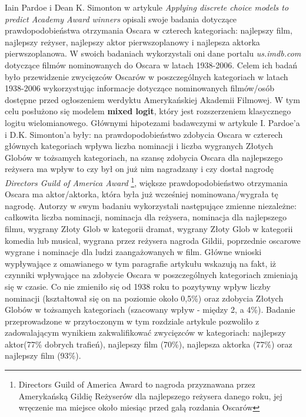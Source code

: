 Iain Pardoe i Dean K. Simonton w artykule \textit{Applying discrete choice models to predict Academy Award winners} \cite{pardoe08} opisali swoje badania dotyczące prawdopodobieństwa otrzymania Oscara w czterech kategoriach: najlepszy film, najlepszy reżyser, najlepszy aktor pierwszoplanowy i najlepsza aktorka pierwszoplanowa. W swoich badaniach wykorzystali oni dane portalu \textit{us.imdb.com} dotyczące filmów nominowanych do Oscara w latach 1938-2006. Celem ich badań było przewidzenie zwycięzców Oscarów w poszczególnych kategoriach w latach 1938-2006 wykorzystując informacje dotyczące nominowanych filmów/osób dostępne przed ogłoszeniem werdyktu Amerykańskiej Akademii Filmowej. W tym celu posłużono się modelem \textbf{ mixed logit}, który jest rozszerzeniem klasycznego logitu wielomianowego. Głównymi hipotezami badawczymi w artykule I. Pardoe'a i D.K. Simonton'a były: na prawdopodobieństwo zdobycia Oscara w czterech głównych kategoriach wpływa liczba nominacji i liczba wygranych Złotych Globów w tożsamych kategoriach, na szansę zdobycia Oscara dla najlepszego reżysera ma wpływ to czy był on już nim nagradzany i czy dostał nagrodę \textit{Directors Guild of America Award} \footnote{ Directors Guild of America Award to nagroda przyznawana przez Amerykańską Gildię Reżyserów dla najlepszego reżysera danego roku, jej wręczenie ma miejsce około miesiąc przed galą rozdania Oscarów}, większe prawdopodobieństwo otrzymania Oscara ma aktor/aktorka, która była już wcześniej nominowana/wygrała tę nagrodę. Autorzy w swym badaniu wykorzystali następujące zmienne niezależne: całkowita liczba nominacji, nominacja dla reżysera, nominacja dla najlepszego filmu, wygrany Złoty Glob w kategorii dramat, wygrany Złoty Glob w kategorii komedia lub musical, wygrana przez reżysera nagroda Gildii, poprzednie oscarowe wygrane i nominacje dla ludzi zaangażowanych w film. Główne wnioski wypływające z omawianego w tym paragrafie artykułu wskazują na fakt, iż czynniki wpływające na zdobycie Oscara w poszczególnych kategoriach zmieniają się w  czasie. Co nie zmieniło się od 1938 roku to pozytywny wpływ  liczby nominacji (kształtował się on na poziomie około 0,5\%) oraz zdobycia Złotych Globów w tożsamych kategoriach (szacowany wpływ - między 2, a 4\%). Badanie przeprowadzone w przytoczonym w tym rozdziale artykule pozwoliło z zadowalającym wynikiem zakwalifikować zwycięzców w kategoriach: najlepszy aktor(77\% dobrych trafień), najlepszy film (70\%), najlepsza aktorka (77\%) oraz najlepszy film (93\%). 

